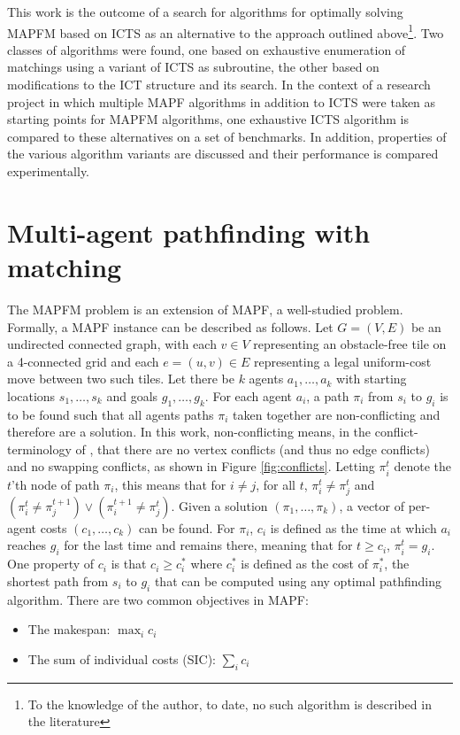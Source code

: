 \documentclass[english,10pt]{article}
\begin{document}
	This work is the outcome of a search for algorithms for optimally solving MAPFM based on ICTS as an alternative to the approach outlined above\footnote{To the knowledge of the author, to date, no such algorithm is described in the literature}. Two classes of algorithms were found, one based on exhaustive enumeration of matchings using a variant of ICTS as subroutine, the other based on modifications to the ICT structure and its search. In the context of a research project in which multiple MAPF algorithms in addition to ICTS were taken as starting points for MAPFM algorithms, one exhaustive ICTS algorithm is compared to these alternatives on a set of benchmarks. In addition, properties of the various algorithm variants are discussed and their performance is compared experimentally.
	
	\section{Multi-agent pathfinding with matching} %
	The MAPFM problem is an extension of MAPF, a well-studied problem. Formally, a MAPF instance can be described as follows. Let $G = (V,E)$ be an undirected connected graph, with each $v\in V$ representing an obstacle-free tile on a 4-connected grid and each $e = (u,v)\in E$ representing a legal uniform-cost move between two such tiles. Let there be $k$ agents $a_1,\ldots,a_k$ with starting locations $s_1,\ldots,s_k$ and goals $g_1,\ldots,g_k$. For each agent $a_i$, a path $\pi_i$ from $s_i$ to $g_i$ is to be found such that all agents paths $\pi_i$ taken together are non-conflicting and therefore are a solution. In this work, non-conflicting means, in the conflict-terminology of \cite{stern2019}, that there are no vertex conflicts (and thus no edge conflicts) and no swapping conflicts, as shown in Figure \ref{fig:conflicts}. Letting $\pi_i^t$ denote the $t$'th node of path $\pi_i$, this means that for $i\neq j$, for all $t$, $\pi_i^t\neq \pi_j^t$ and $(\pi_i^t \neq \pi_j^{t + 1})\lor(\pi_i^{t+1} \neq \pi_j^t)$. Given a solution $(\pi_1,\ldots,\pi_k)$, a vector of per-agent costs $(c_1,\ldots,c_k)$ can be found. For $\pi_i$, $c_i$ is defined as the time at which $a_i$ reaches $g_i$ for the last time and remains there, meaning that for $t \geq c_i$, $\pi_i^{t} = g_i$. One property of $c_i$ is that $c_i \geq c^*_i$ where $c^*_i$ is defined as the cost of $\pi^*_i$, the shortest path from $s_i$ to $g_i$ that can be computed using any optimal pathfinding algorithm. There are two common objectives in MAPF:
	\begin{itemize}
		\item The makespan: $\max_{i} c_i$
		\item The sum of individual costs (SIC): $\sum_i c_i$
	\end{itemize}
\end{document}
